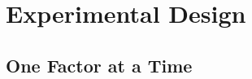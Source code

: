 \section{Experimental Design}
\label{sec:experimental_design}

\subsection{One Factor at a Time}
\label{ssec:one_factor}


